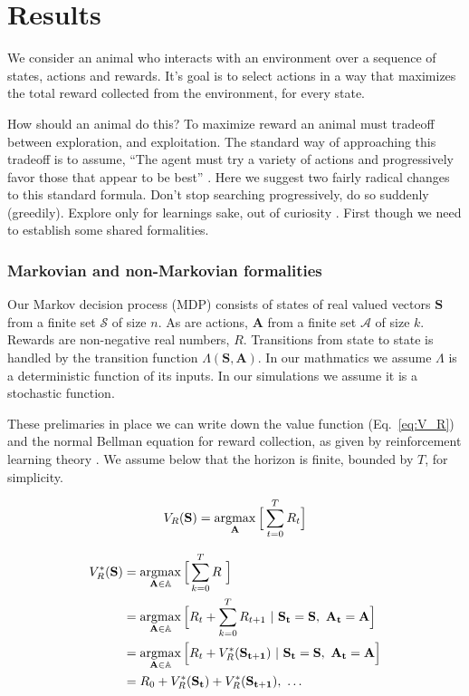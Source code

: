 \section{Results} 
We consider an animal who interacts with an environment over a sequence of states, actions and rewards. It's goal is to select actions in a way that maximizes the total reward collected from the environment, for every state. 

How should an animal do this? To maximize reward an animal must tradeoff between exploration, and exploitation. The standard way of approaching this tradeoff is to assume, ``The agent must try a variety of actions and progressively favor those that appear to be best'' \cite{Sutton2018}. Here we suggest two fairly radical changes to this standard formula. Don’t stop searching progressively, do so suddenly (greedily). Explore only for learnings sake, out of curiosity \citep{Kidd2015}. First though we need to establish some shared formalities.

\subsubsection{Markovian and non-Markovian formalities}
Our Markov decision process (MDP) consists of states of real valued vectors $\mathbf{S}$ from a finite set $\mathcal{S}$ of size $n$. As are actions, $\mathbf{A}$ from a finite set $\mathcal{A}$ of size $k$. Rewards are non-negative real numbers, $R$. Transitions from state to state is handled by the transition function $\Lambda(\mathbf{S},\mathbf{A})$. In our mathmatics we assume $\Lambda$ is a deterministic function of its inputs. In our simulations we assume it is a stochastic function.

These prelimaries in place we can write down the value function (Eq.~\ref{eq:V_R}) and the normal Bellman equation \cite{Bellmann1954} for reward collection, as given by reinforcement learning theory \citep{Sutton2018}. We assume below that the horizon is finite, bounded by $T$, for simplicity.

\begin{equation}
	\label{eq:V_R}
	V_R(\mathbf{S}) = \operatorname*{argmax}_{\mathbf{A}} \Big [ \sum_{t=0}^{T} R_t \Big ]
\end{equation}

\begin{equation} 
	\label{eq:bellman_seq}
    \begin{split}
        V^*_{R}(\mathbf{S}) &= \argmax_{\mathbf{A} \in \mathbb{A}} \Big [\sum_{k=0}^{T}  R \ \Big ]\\
                         	&= \argmax_{\mathbf{A} \in \mathbb{A}} \Big [ R_{t} + \sum_{k=0}^{T} R_{t+1} \ | \ \mathbf{S_t} = \mathbf{S},\ \mathbf{A_t} = \mathbf{A} \Big ]\\
							&= \argmax_{\mathbf{A} \in \mathbb{A}} \Big [ R_{t} + V^*_{R}(\mathbf{S_{t+1}}) \ | \ \mathbf{S_t} = \mathbf{S},\ \mathbf{A_t} = \mathbf{A} \Big ]\\
                         	&= R_0 + V^*_{R}(\mathbf{S_{t}}) + V^*_{R}(\mathbf{S_{t+1}}),\ \ldots
    \end{split}
\end{equation}

